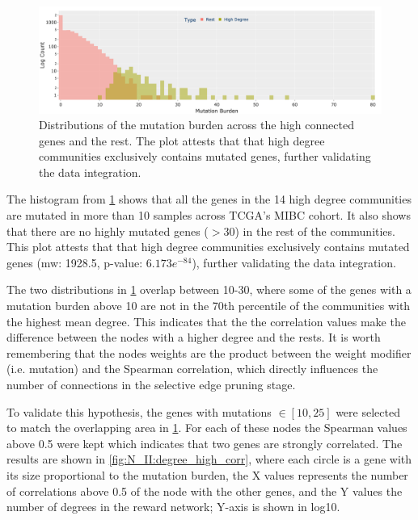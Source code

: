 \begin{figure}[!b]    
    \centering
        \includegraphics[width=1.0\textwidth,height=1.0\textheight,keepaspectratio]{Sections/Network_II/resources/reward/smallCom_MutHist.png}
        \caption[Mutation burden of the highly connected genes]{Distributions of the mutation burden across the high connected genes and the rest. The plot attests that that high degree communities exclusively contains mutated genes, further validating the data integration.}
        \label{fig:N_II:hist_molecular_highCon}
\end{figure}


The histogram from \cref{fig:N_II:hist_molecular_highCon} shows that all the genes in the 14 high degree communities are mutated in more than 10 samples across TCGA's MIBC cohort. It also shows that there are no highly mutated genes ($>$30) in the rest of the communities. This plot attests that that high degree communities exclusively contains mutated genes (\acrshort{mw}: 1928.5, p-value: $6.173e^{-84}$), further validating the data integration.

The two distributions in \cref{fig:N_II:hist_molecular_highCon} overlap between 10-30, where some of the genes with a mutation burden above 10 are not in the 70th percentile of the communities with the highest mean degree. This indicates that the the correlation values make the difference between the nodes with a higher degree and the rests. It is worth remembering that the nodes weights are the product between the weight modifier (i.e. mutation) and the Spearman correlation, which directly influences the number of connections in the selective edge pruning stage.

To validate this hypothesis, the genes with mutations $\in[10,25]$ were selected to match the overlapping area in \cref{fig:N_II:hist_molecular_highCon}. For each of these nodes the Spearman values above 0.5 were kept which indicates that two genes are strongly correlated. The results are shown in \cref{fig:N_II:degree_high_corr}, where each circle is a gene with its size proportional to the mutation burden, the X values represents the number of correlations above 0.5 of the node with the other genes, and the Y values the number of degrees in the reward network; Y-axis is shown in log10. 

